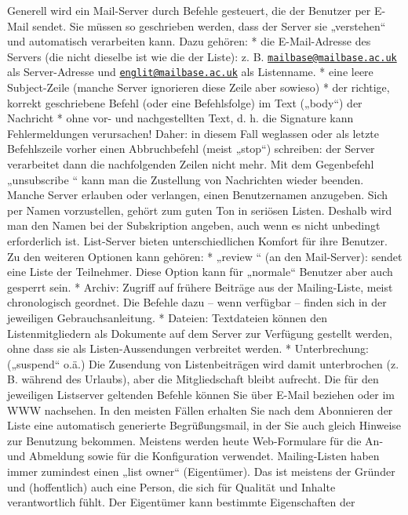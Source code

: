 \documentclass[]{book}
\theoremstyle{definition}
\theoremstyle{definition}
\theoremstyle{definition}
\theoremstyle{remark}
\begin{document}
Generell wird ein Mail-Server durch Befehle gesteuert, die der Benutzer
per E-Mail sendet. Sie müssen so geschrieben werden, dass der Server sie
„verstehen`` und automatisch verarbeiten kann. Dazu gehören: * die
E-Mail-Adresse des Servers (die nicht dieselbe ist wie die der Liste):
z. B.
\href{mailto:mailbase@mailbase.ac.uk}{\nolinkurl{mailbase@mailbase.ac.uk}}
als Server-Adresse und
\href{mailto:englit@mailbase.ac.uk}{\nolinkurl{englit@mailbase.ac.uk}}
als Listenname. * eine leere Subject-Zeile (manche Server ignorieren
diese Zeile aber sowieso) * der richtige, korrekt geschriebene Befehl
(oder eine Befehlsfolge) im Text („body``) der Nachricht * ohne vor- und
nachgestellten Text, d. h. die Signature kann Fehlermeldungen
verursachen! Daher: in diesem Fall weglassen oder als letzte
Befehlszeile vorher einen Abbruchbefehl (meist „stop``) schreiben: der
Server verarbeitet dann die nachfolgenden Zeilen nicht mehr. Mit dem
Gegenbefehl „unsubscribe `` kann man die Zustellung von Nachrichten
wieder beenden. Manche Server erlauben oder verlangen, einen
Benutzernamen anzugeben. Sich per Namen vorzustellen, gehört zum guten
Ton in seriösen Listen. Deshalb wird man den Namen bei der Subskription
angeben, auch wenn es nicht unbedingt erforderlich ist. List-Server
bieten unterschiedlichen Komfort für ihre Benutzer. Zu den weiteren
Optionen kann gehören: * „review `` (an den Mail-Server): sendet eine
Liste der Teilnehmer. Diese Option kann für „normale`` Benutzer aber
auch gesperrt sein. * Archiv: Zugriff auf frühere Beiträge aus der
Mailing-Liste, meist chronologisch geordnet. Die Befehle dazu -- wenn
verfügbar -- finden sich in der jeweiligen Gebrauchsanleitung. *
Dateien: Textdateien können den Listenmitgliedern als Dokumente auf dem
Server zur Verfügung gestellt werden, ohne dass sie als
Listen-Aussendungen verbreitet werden. * Unterbrechung: („suspend``
o.ä.) Die Zusendung von Listenbeiträgen wird damit unterbrochen (z. B.
während des Urlaubs), aber die Mitgliedschaft bleibt aufrecht. Die für
den jeweiligen Listserver geltenden Befehle können Sie über E-Mail
beziehen oder im WWW nachsehen. In den meisten Fällen erhalten Sie nach
dem Abonnieren der Liste eine automatisch generierte Begrüßungsmail, in
der Sie auch gleich Hinweise zur Benutzung bekommen. Meistens werden
heute Web-Formulare für die An- und Abmeldung sowie für die
Konfiguration verwendet. Mailing-Listen haben immer zumindest einen
„list owner`` (Eigentümer). Das ist meistens der Gründer und
(hoffentlich) auch eine Person, die sich für Qualität und Inhalte
verantwortlich fühlt. Der Eigentümer kann bestimmte Eigenschaften der
\end{document}
